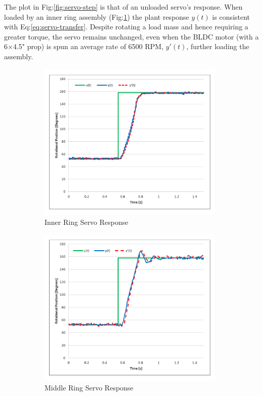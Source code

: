\par
The plot in Fig:\ref{fig:servo-step} is that of an unloaded servo's response. When loaded by an inner ring assembly (Fig:\ref{fig:servo-step-inner}) the plant response $y(t)$ is consistent with Eq:\ref{eq:servo-transfer}. Despite rotating a load mass and hence requiring a greater torque, the servo remains unchanged, even when the BLDC motor (with a 6$\times$4.5" prop) is spun an average rate of 6500 RPM, $y'(t)$, further loading the assembly.
\begin{figure}[hbtp]
\begin{subfigure}{0.5\textwidth}
\centering
\includegraphics[width=0.98\textwidth]{graphs/servo-step-inner}
\caption{Inner Ring Servo Response}
\label{fig:servo-step-inner}
\end{subfigure}
\begin{subfigure}{0.5\textwidth}
\centering
\includegraphics[width=0.98\textwidth]{graphs/servo-step-middle}
\caption{Middle Ring Servo Response}
\label{fig:servo-step-middle}
\end{subfigure}
\caption{}
\end{figure}
